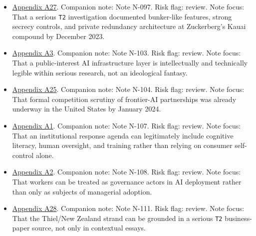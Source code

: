 \documentclass[
  american,
  11pt,
  letterpaper,
]{article}
\begin{document}
\begin{itemize}
\item
  \hyperref[ch-10-appendix-a27-inside-mark-zuckerbergs-top-secret-hawaii-compound]{Appendix
  A27}. Companion note: Note N-097. Risk flag: review. Note focus: That
  a serious \texttt{T2} investigation documented bunker-like features,
  strong secrecy controls, and private redundancy architecture at
  Zuckerberg's Kauai compound by December 2023.
\item
  \hyperref[ch-10-appendix-a3-interactions-between-artificial-intelligence-and-digital-public-infrastructure-concepts-benefits-and-challenges]{Appendix
  A3}. Companion note: Note N-103. Risk flag: review. Note focus: That a
  public-interest AI infrastructure layer is intellectually and
  technically legible within serious research, not an ideological
  fantasy.
\item
  \hyperref[ch-10-appendix-a25-ftc-opens-inquiry-into-big-tech-s-partnerships-with-leading-ai-startups]{Appendix
  A25}. Companion note: Note N-104. Risk flag: review. Note focus: That
  formal competition scrutiny of frontier-AI partnerships was already
  underway in the United States by January 2024.
\item
  \hyperref[ch-10-appendix-a1-artificial-intelligence-and-the-future-of-teaching-and-learning-insights-and-recommendations]{Appendix
  A1}. Companion note: Note N-107. Risk flag: review. Note focus: That
  an institutional response agenda can legitimately include cognitive
  literacy, human oversight, and training rather than relying on
  consumer self-control alone.
\item
  \hyperref[ch-10-appendix-a2-in-oxford-handbook-on-ai-governance-the-role-of-workers-in-ai-ethics-and-governance]{Appendix
  A2}. Companion note: Note N-108. Risk flag: review. Note focus: That
  workers can be treated as governance actors in AI deployment rather
  than only as subjects of managerial adoption.
\item
  \hyperref[ch-10-appendix-a28-new-zealand-woos-the-wealthy-with-golden-visa-changes]{Appendix
  A28}. Companion note: Note N-111. Risk flag: review. Note focus: That
  the Thiel/New Zealand strand can be grounded in a serious \texttt{T2}
  business-paper source, not only in contextual essays.
\end{itemize}
\end{document}
